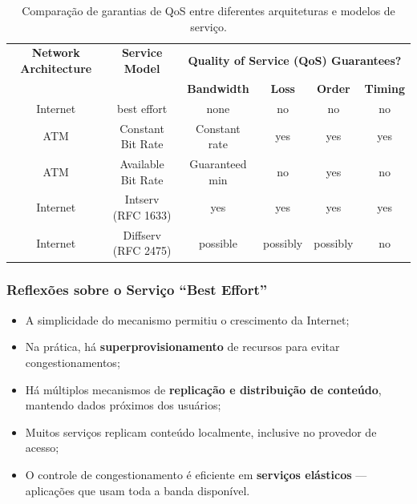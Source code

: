         \begin{table}[h!]
            \centering
            \renewcommand{\arraystretch}{1.3}
            \setlength{\tabcolsep}{3pt}
            \begin{tabular}{|c|c|cccc|}
                \hline
                \textbf{Network Architecture} & \textbf{Service Model} &
                \multicolumn{4}{c|}{\textbf{Quality of Service (QoS) Guarantees?}} \\ \cline{3-6}
                & & \textbf{Bandwidth} & \textbf{Loss} & \textbf{Order} & \textbf{Timing} \\ \hline
                Internet & best effort & none & no & no & no \\ \hline
                ATM & Constant Bit Rate & Constant rate & yes & yes & yes \\ \hline
                ATM & Available Bit Rate & Guaranteed min & no & yes & no \\ \hline
                Internet & Intserv (RFC 1633) & yes & yes & yes & yes \\ \hline
                Internet & Diffserv (RFC 2475) & possible & possibly & possibly & no \\ \hline
            \end{tabular}
            \caption{Comparação de garantias de QoS entre diferentes arquiteturas e modelos de serviço.}
        \end{table}

        \subsubsection*{Reflexões sobre o Serviço “Best Effort”}
            \begin{itemize}[left=0.5cm, align=left, nosep]
                \item A simplicidade do mecanismo permitiu o crescimento da Internet;
                \item Na prática, há \textbf{superprovisionamento} de recursos para evitar congestionamentos;
                \item Há múltiplos mecanismos de \textbf{replicação e distribuição de conteúdo}, mantendo dados próximos dos usuários;
                \item Muitos serviços replicam conteúdo localmente, inclusive no provedor de acesso;
                \item O controle de congestionamento é eficiente em \textbf{serviços elásticos} — aplicações que usam toda a banda disponível.
            \end{itemize}

